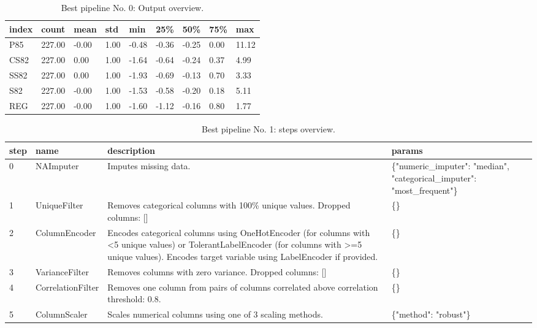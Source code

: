 \documentclass{article}%
\begin{document}
%


\begin{table}[H]%
\begin{center}%
\renewcommand{\arraystretch}{1.5}%
\begin{tabular}{l l l l l l l l l}%
\hline%
\textbf{index}&\textbf{count}&\textbf{mean}&\textbf{std}&\textbf{min}&\textbf{25\%}&\textbf{50\%}&\textbf{75\%}&\textbf{max}\\%
\hline%
P85&227.00&{-}0.00&1.00&{-}0.48&{-}0.36&{-}0.25&0.00&11.12\\%
CS82&227.00&0.00&1.00&{-}1.64&{-}0.64&{-}0.24&0.37&4.99\\%
SS82&227.00&0.00&1.00&{-}1.93&{-}0.69&{-}0.13&0.70&3.33\\%
S82&227.00&{-}0.00&1.00&{-}1.53&{-}0.58&{-}0.20&0.18&5.11\\%
REG&227.00&{-}0.00&1.00&{-}1.60&{-}1.12&{-}0.16&0.80&1.77\\%
\hline%
\end{tabular}%
\end{center}%
\caption{Best pipeline No. 0: Output overview.}%
\end{table}

%


\begin{table}[H]%
\begin{center}%
\renewcommand{\arraystretch}{1.5}%
\begin{tabular}{p{7mm} p{35mm} p{80mm} p{50mm}}%
\hline%
\textbf{step}&\textbf{name}&\textbf{description}&\textbf{params}\\%
\hline%
0&NAImputer&Imputes missing data.&\{"numeric\_imputer": "median", "categorical\_imputer": "most\_frequent"\}\\%
1&UniqueFilter&Removes categorical columns with 100\% unique values. Dropped columns: {[}{]}&\{\}\\%
2&ColumnEncoder&Encodes categorical columns using OneHotEncoder (for columns with <5 unique values) or TolerantLabelEncoder (for columns with >=5 unique values). Encodes target variable using LabelEncoder if provided.&\{\}\\%
3&VarianceFilter&Removes columns with zero variance. Dropped columns: {[}{]}&\{\}\\%
4&CorrelationFilter&Removes one column from pairs of columns correlated above correlation threshold: 0.8.&\{\}\\%
5&ColumnScaler&Scales numerical columns using one of 3 scaling methods.&\{"method": "robust"\}\\%
\hline%
\end{tabular}%
\end{center}%
\caption{Best pipeline No. 1: steps overview.}%
\end{table}
\end{document}
